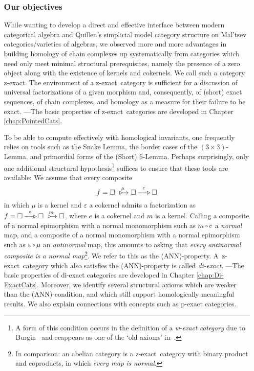 \documentclass [12pt,oneside]{book}%
\theoremstyle{captionstyle}  %
\newcommand{\Comp}{\raisebox{0.1ex}{\ensuremath{\,\scriptstyle{\circ}}\,}}
\newcommand{\NEpi}{-\hspace{-0.8ex}-\hspace{-0.7ex}\triangleright}	%
\newcommand{\NMono}{\ \triangleright\hspace{-0.9ex}\rightarrow}			%
\newcommand{\DiagObj}{\square}
\newcommand{\ZExact}{z-exact}									%
\newcommand{\Prdct}[2]{#1 \times #2}	 	%
\newcommand{\ANNInline}{(ANN)}																%
\begin{document}
\subsubsection*{Our objectives}
While wanting to develop a direct and effective interface between modern categorical algebra and Quillen's simplicial model category structure on Mal'tsev categories/varieties of algebras, we observed more and more advantages in building homology of chain complexes up systematically from categories which need only meet minimal structural prerequisites, namely the presence of a zero object along with the existence of kernels and cokernels. We call such a category \ZExact. The environment of a \ZExact\ category is sufficient for a discussion of universal factorizations of a given morphism and, consequently, of (short) exact sequences, of chain complexes, and homology as a measure for their failure to be exact. ---The basic properties of \ZExact\ categories are developed in Chapter \ref{chap:PointedCats}.

To be able to compute effectively with homological invariants, one frequently relies on tools such as the Snake Lemma, the border cases of the $(\Prdct{3}{3})$-Lemma, and primordial forms of the (Short) $5$-Lemma. Perhaps surprisingly, only one additional structural hypothesis\footnote{A form of this condition occurs in the definition of a \emph{w-exact category} due to Burgin~\cite{MR0352198} and reappears as one of the `old axioms' in~\cite{Janelidze-Marki-Tholen}.} suffices to ensure that these tools are available: We assume that every composite
\begin{equation*}
    f=\DiagObj \overset{\mu}{\NMono} \DiagObj \overset{\varepsilon}{\NEpi} \DiagObj
\end{equation*}
in which $\mu$ is a kernel and $\varepsilon$ a cokernel admits a factorization as $f=\DiagObj \overset{e}{\NEpi} \DiagObj \overset{m}{\NMono}\DiagObj$, where $e$ is a cokernel and $m$ is a kernel. Calling a composite of a normal epimorphism with a normal monomorphism such as $m\Comp e$ a \emph{normal} map, and a composite of a normal monomorphism with a normal epimorphism such as $\varepsilon\Comp \mu$ an \emph{antinormal} map, this amounts to asking that \emph{every antinormal composite is a normal map}\footnote{In comparison: an abelian category is a \ZExact\ category with binary product and coproducts, in which \emph{every map is normal}.}. We refer to this as the \ANNInline-property. A~\ZExact\ category which also satisfies the \ANNInline-property is called \emph{di-exact}. ---The basic properties of di-exact categories are developed in Chapter \ref{chap:Di-ExactCats}. Moreover, we identify several structural axioms which are weaker than the \ANNInline-condition, and which still support homologically meaningful results.  We also explain connections with concepts such as p-exact categories.
\end{document}
